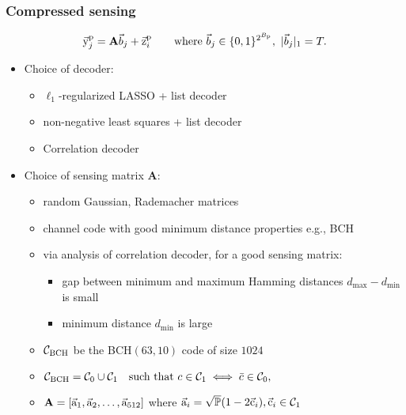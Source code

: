 \begin{frame}\frametitle{Compressed sensing}
{\footnotesize
	\begin{align*}
	\vec{\mathrm{y}}^{\mathrm{p}}_j	=\mathbf{A}\vec{b}_j+\vec{\mathrm{z}}^{\mathrm{p}}_i \qquad \text{where }\vec{b}_j\in\{0,1\}^{2^{B_{\mathrm{p}}}},~ |\vec{b}_j|_1=T.
	\end{align*}
	}
	\vspace{-3ex}
\begin{itemize}
\item Choice of decoder:
	\begin{itemize}
		\item $\ell_1$-regularized LASSO + list decoder
		\item non-negative least squares + list decoder
		\item Correlation decoder
	\end{itemize}
\pause
\item Choice of sensing matrix $\mathbf{A}$:
	\begin{itemize}
		\item random Gaussian, Rademacher matrices
		\item channel code with good minimum distance properties e.g., BCH
		\pause
		\item via analysis of correlation decoder, for a good sensing matrix:		
			\begin{itemize}
				 \item gap between minimum and maximum Hamming distances $d_{\max}-d_{\min}$ is small
				 \item minimum distance $d_{\min}$ is large
			\end{itemize}
	\item $\mathcal{C}_{\text{BCH}}$ be the BCH$(63,10)$ code of size $1024$
	\item $\mathcal{C}_{\text{BCH}}=\mathcal{C}_0\cup \mathcal{C}_1 ~~\text{ such that } c\in \mathcal{C}_1 \iff \bar{c}\in\mathcal{C}_0,$
	\item $\mathbf{A}=[\vec{\mathrm{a}}_1,\vec{\mathrm{a}}_2,\ldots,\vec{\mathrm{a}}_{512}]$ where $\vec{\mathrm{a}}_i=\sqrt{\mathbb{P}}(1-2\vec{\mathrm{c}}_i), \vec{\mathrm{c}}_i\in\mathcal{C}_1$%
	\end{itemize}

\end{itemize}
\end{frame}


